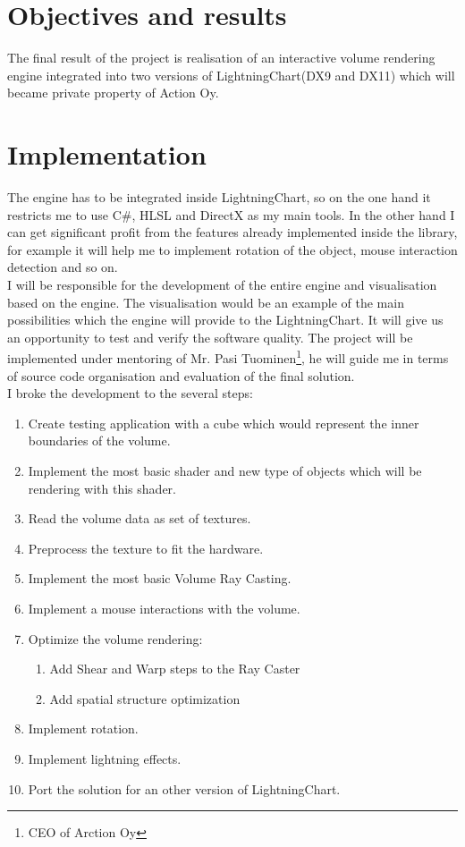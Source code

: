 \documentclass[english]{article}
\begin{document}
\section{Objectives and results} 

The final result of the project is realisation of an interactive volume rendering engine integrated into two versions of LightningChart(DX9 and DX11) which will became private property of Action Oy.

\section{Implementation}
The engine has to be integrated inside LightningChart, so on the one hand it restricts me to use C\#, HLSL and DirectX as my main tools. In the other hand I can get significant profit from the features already implemented inside the library, for example it will help me to implement rotation of the object, mouse interaction detection and so on.\\

I will be responsible for the development of the entire engine and visualisation based on the engine. The visualisation would be an example of the main possibilities which the engine will provide to the LightningChart. It will give us an opportunity to test and verify the software quality. The project will be implemented under mentoring of Mr. Pasi Tuominen\footnote{CEO of Arction Oy}, he will guide me in terms of source code organisation and evaluation of the final solution.\\

I broke the development to the several steps:
\begin{enumerate}
\item Create testing application with a cube which would represent the inner boundaries of the volume. 
\item Implement the most basic shader and new type of objects which will be rendering with this shader.
\item Read the volume data as set of textures.
\item Preprocess the texture to fit the hardware. 
\item Implement the most basic Volume Ray Casting. 
\item Implement a mouse interactions with the volume.
\item Optimize the volume rendering: 
\begin{enumerate}
\item Add Shear and Warp steps to the Ray Caster 
\item Add spatial structure optimization
\end{enumerate}
\item Implement rotation.
\item Implement lightning effects. 
\item Port the solution for an other version of LightningChart.
\end{enumerate}
\end{document}

